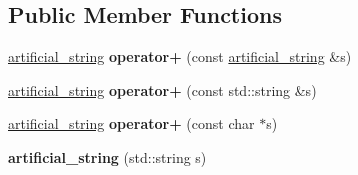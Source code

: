 \subsection*{Public Member Functions}
\begin{DoxyCompactItemize}
\item 
\hyperlink{classartificial__string}{artificial\+\_\+string} {\bfseries operator+} (const \hyperlink{classartificial__string}{artificial\+\_\+string} \&s)\hypertarget{classartificial__string_adc63e00c5fc5b22dff3865e89882fa26}{}\label{classartificial__string_adc63e00c5fc5b22dff3865e89882fa26}

\item 
\hyperlink{classartificial__string}{artificial\+\_\+string} {\bfseries operator+} (const std\+::string \&s)\hypertarget{classartificial__string_a059d54e7a346a1c0bafceb3dc34fdc84}{}\label{classartificial__string_a059d54e7a346a1c0bafceb3dc34fdc84}

\item 
\hyperlink{classartificial__string}{artificial\+\_\+string} {\bfseries operator+} (const char $\ast$s)\hypertarget{classartificial__string_af3c69f5263c568a78f2da48f6f71ec3d}{}\label{classartificial__string_af3c69f5263c568a78f2da48f6f71ec3d}

\item 
{\bfseries artificial\+\_\+string} (std\+::string s)\hypertarget{classartificial__string_a8786c2a3eb31d7543fcc1e512d22562a}{}\label{classartificial__string_a8786c2a3eb31d7543fcc1e512d22562a}


\end{DoxyCompactItemize}
